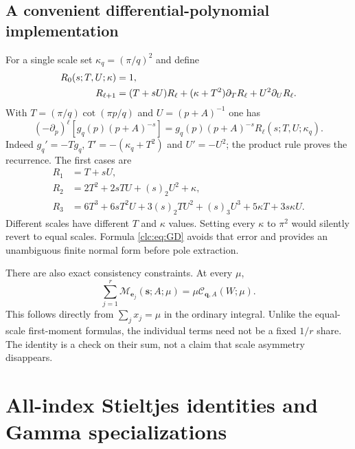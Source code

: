 \documentclass[11pt,a4paper]{article}
\numberwithin{equation}{section}
\theoremstyle{definition}\newtheorem{definition}[theorem]{Definition}
\theoremstyle{remark}\newtheorem{remark}[theorem]{Remark}
\newcommand{\bq}{\boldsymbol q}\newcommand{\bs}{\boldsymbol s}
\newcommand{\CC}{\mathcal C}\newcommand{\UU}{\mathcal U}\newcommand{\EE}{\mathcal E}
\begin{document}
\subsection{A convenient differential-polynomial implementation}
For a single scale set $\kappa_q=(\pi/q)^2$ and define
\begin{align}
 R_0(s;T,U;\kappa)&=1,\notag\\
 R_{\ell+1}&=(T+sU)R_\ell
       +(\kappa+T^2)\partial_TR_\ell+U^2\partial_UR_\ell.
 \label{clc:eq:Rrec}
\end{align}
With $T=(\pi/q)\cot(\pi p/q)$ and $U=(p+A)^{-1}$ one has
\begin{equation}\label{clc:eq:Ridentity}
 (-\partial_p)^\ell[g_q(p)(p+A)^{-s}]
 =g_q(p)(p+A)^{-s}R_\ell(s;T,U;\kappa_q).
\end{equation}
Indeed $g_q'=-Tg_q$, $T'=-(\kappa_q+T^2)$ and $U'=-U^2$;
the product rule proves the recurrence. The first cases are
\begin{align*}
 R_1&=T+sU,\\
 R_2&=2T^2+2sTU+(s)_2U^2+\kappa,\\
 R_3&=6T^3+6sT^2U+3(s)_2TU^2+(s)_3U^3
                  +5\kappa T+3s\kappa U.
\end{align*}
Different scales have different $T$ and $\kappa$ values. Setting every
$\kappa$ to $\pi^2$ would silently revert to equal scales.
Formula \eqref{clc:eq:GD} avoids that error and provides an unambiguous
finite normal form before pole extraction.

There are also exact consistency constraints. At every $\mu$,
\begin{equation}\label{clc:eq:moment-sum}
 \sum_{j=1}^r\mathcal M_{\boldsymbol e_j}(\bs;A;\mu)
       =\mu\CC_{\bq,A}(W;\mu).
\end{equation}
This follows directly from $\sum_jx_j=\mu$ in the ordinary integral.
Unlike the equal-scale first-moment formulas, the individual terms need
not be a fixed $1/r$ share. The identity is a check on their sum, not a
claim that scale asymmetry disappears.

\section{All-index Stieltjes identities and Gamma specializations}
\label{clc:sec:stieltjes}
\end{document}
